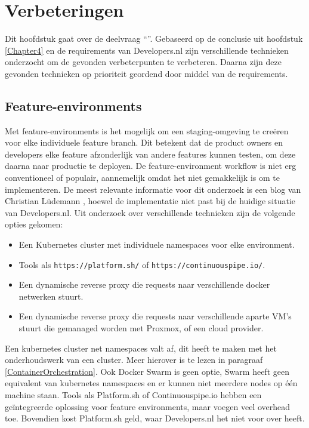 \chapter{Verbeteringen}

\label{Chapter5}

Dit hoofdstuk gaat over de deelvraag \enquote{\deelverbetering}. Gebaseerd op de conclusie uit hoofdstuk \ref{Chapter4} en de requirements van Developers.nl zijn verschillende technieken onderzocht om de gevonden verbeterpunten te verbeteren. Daarna zijn deze gevonden technieken op prioriteit geordend door middel van de requirements. 

\section{Feature-environments}
\label{VerbeteringFeatureEnvironments}
Met feature-environments is het mogelijk om een staging-omgeving te creëren voor elke individuele feature branch. Dit betekent dat de product owners en developers elke feature afzonderlijk van andere features kunnen testen, om deze daarna naar productie te deployen. De feature-environment workflow is niet erg conventioneel of populair, aannemelijk omdat het niet gemakkelijk is om te implementeren. De meest relevante informatie voor dit onderzoek is een blog van Christian Lüdemann \parencite{FeatureEnvs}, hoewel de implementatie niet past bij de huidige situatie van Developers.nl. Uit onderzoek over verschillende technieken zijn de volgende opties gekomen:
\begin{itemize}
	\item Een Kubernetes cluster met individuele namespaces voor elke environment.
	\item Tools als \texttt{https://platform.sh/} of \texttt{https://continuouspipe.io/}.
	\item Een dynamische reverse proxy die requests naar verschillende docker netwerken stuurt.
	\item Een dynamische reverse proxy die requests naar verschillende aparte VM's stuurt die gemanaged worden met Proxmox, of een cloud provider.
\end{itemize}

Een kubernetes cluster net namespaces valt af, dit heeft te maken met het onderhoudswerk van een cluster. Meer hierover is te lezen in paragraaf \ref{ContainerOrchestration}. Ook Docker Swarm is geen optie, Swarm heeft geen equivalent van kubernetes namespaces en er kunnen niet meerdere nodes op één machine staan. Tools als Platform.sh of Continuouspipe.io hebben een geïntegreerde oplossing voor feature environments, maar voegen veel overhead toe. Bovendien kost Platform.sh geld, waar Developers.nl het niet voor over heeft.

